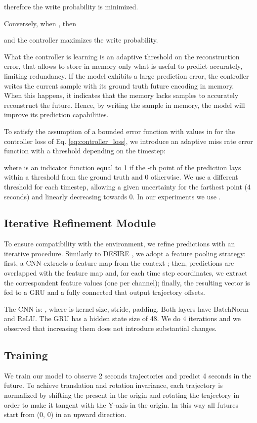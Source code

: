 \documentclass[10pt,twocolumn,letterpaper]{article}
\begin{document}
therefore the write probability is minimized.

Conversely, when , then

and the controller maximizes the write probability.

What the controller is learning is an adaptive threshold on the reconstruction error, that allows to store in memory only what is useful to predict accurately, limiting redundancy. If the model exhibits a large prediction error, the controller writes the current sample with its ground truth future encoding in memory. When this happens, it indicates that the memory lacks samples to accurately reconstruct the future. Hence, by writing the sample in memory, the model will improve its prediction capabilities.

To satisfy the assumption of a bounded error function with values in  for the controller loss of Eq. \ref{eq:controller_loss}, we introduce an adaptive miss rate error function with a threshold depending on the timestep:


where  is an indicator function equal to 1 if the -th point of the prediction  lays within a threshold  from the ground truth and 0 otherwise. We use a different threshold for each timestep, allowing a given uncertainty for the farthest point (4 seconds) and linearly decreasing towards 0. In our experiments we use .






\subsection{Iterative Refinement Module}
To ensure compatibility with the environment, we refine predictions with an iterative procedure. Similarly to DESIRE \cite{lee2017desire}, we adopt a feature pooling strategy: first, a CNN extracts a feature map  from the context ; then, predictions are overlapped with the feature map and, for each time step coordinates, we extract the correspondent feature values (one per channel); finally, the resulting vector is fed to a GRU and a fully connected that output trajectory offsets.


The CNN is: , where  is kernel size,  stride,  padding. Both layers have BatchNorm and ReLU. The GRU has a hidden state size of 48.
We do 4 iterations and we observed that increasing them does not introduce substantial changes.

\subsection{Training}
\label{sec:training}
We train our model to observe 2 seconds trajectories and predict 4 seconds in the future. 
To achieve translation and rotation invariance, each trajectory is normalized by shifting the present in the origin and rotating the trajectory in order to make it  tangent with the Y-axis in the origin. In this way all futures start from (0, 0) in an upward direction.
\end{document}
